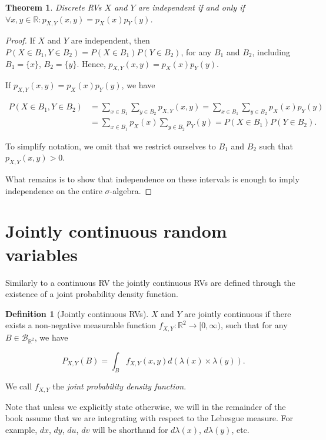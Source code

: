 \documentclass{book}
\theoremstyle{plain}%
\newtheorem{theorem}{Theorem}[section]
\theoremstyle{definition}
\newtheorem{definition}{Definition}[section]
\newlength{\arrow}
\begin{document}
\begin{theorem}
Discrete RVs $X$ and $Y$ are independent if and only if $\forall x,y \in \mathbb{R}: p_{X,Y}(x,y) = p_X(x)p_Y(y)$.
\end{theorem}

\begin{proof}
If $X$ and $Y$ are independent, then $P(X \in B_1, Y \in B_2) = P(X \in B_1)P(Y \in B_2)$, for any $B_1$ and $B_2$, including $B_1 = \{x\}$, $B_2 = \{y\}$. Hence, $p_{X,Y}(x,y) = p_X(x)p_Y(y)$.

If $p_{X,Y}(x,y) = p_X(x)p_Y(y)$, we have 

\begin{align*}
P(X \in B_1, Y \in B_2) &= \sum_{x \in B_1} \sum_{y \in B_2} p_{X,Y}(x,y) = \sum_{x \in B_1} \sum_{y \in B_2} p_{X}(x)p_{Y}(y)\\
&=\sum_{x \in B_1} p_{X}(x) \sum_{y \in B_2} p_{Y}(y) = P(X \in B_1)P(Y \in B_2).
\end{align*}

To simplify notation, we omit that we restrict ourselves to $B_1$ and $B_2$ such that $p_{X,Y}(x,y) > 0$.

What remains is to show that independence on these intervals is enough to imply independence on the entire $\sigma$-algebra.

\end{proof}

\section{Jointly continuous random variables}

Similarly to a continuous RV the jointly continuous RVs are defined through the existence of a joint probability density function.

\begin{definition}[Jointly continuous RVs]
$X$ and $Y$ are jointly continuous if there exists a non-negative measurable function $f_{X,Y}:\mathbb{R}^2 \rightarrow [0, \infty)$, such that for any $B \in \mathcal{B}_{\mathbb{R}^2}$, we have 

$$P_{X,Y}(B) = \int_{B} f_{X,Y}(x, y) d(\lambda(x) \times \lambda(y)).$$

We call $f_{X,Y}$ the \emph{joint probability density function}.
\end{definition}

Note that unless we explicitly state otherwise, we will in the remainder of the book assume that we are integrating with respect to the Lebesgue measure. For example, $dx$, $dy$, $du$, $dv$ will be shorthand for $d\lambda(x)$, $d\lambda(y)$, etc.
\end{document}
